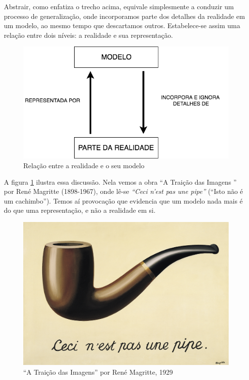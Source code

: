 Abstrair, como enfatiza o trecho acima, equivale simplesmente a conduzir um processo de generalização, onde incorporamos parte dos detalhes da realidade em um modelo, ao mesmo tempo que descartamos outros. Estabelece-se assim uma relação entre dois níveis: a realidade e sua representação.

\begin{figure}[!htb]
	\caption{Relação entre a realidade e o seu modelo}
	\begin{center}
	    \includegraphics[scale=0.65]{imagens/modelo_e_realidade.png}
	\end{center}
\end{figure}

A figura \ref{fig:pipe} ilustra essa discussão. Nela vemos a obra ``A Traição das Imagens '' por René Magritte (1898-1967), onde lê-se \textit{``Ceci n'est pas une pipe''} (``Isto não é um cachimbo''). Temos aí provocação que evidencia que um modelo nada mais é do que uma representação, e não a realidade em si.

\begin{figure}[!htb]
	\caption{``A Traição das Imagens'' por René Magritte, 1929}
	\begin{center}
	    \includegraphics[scale=0.75]{imagens/pipe}
	\end{center}
	\label{fig:pipe}
\end{figure}

